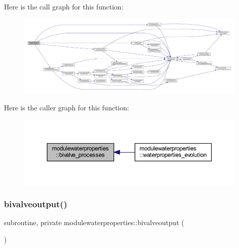 Here is the call graph for this function\+:\nopagebreak
\begin{figure}[H]
\begin{center}
\leavevmode
\includegraphics[width=350pt]{namespacemodulewaterproperties_aa43273d07b646deb6e4c72e757b19fbd_cgraph}
\end{center}
\end{figure}
Here is the caller graph for this function\+:\nopagebreak
\begin{figure}[H]
\begin{center}
\leavevmode
\includegraphics[width=350pt]{namespacemodulewaterproperties_aa43273d07b646deb6e4c72e757b19fbd_icgraph}
\end{center}
\end{figure}
\mbox{\label{namespacemodulewaterproperties_a8446703f7cbfef308ed1b6f7114594a2}} 
\subsubsection{\texorpdfstring{bivalveoutput()}{bivalveoutput()}}
{\footnotesize\ttfamily subroutine, private modulewaterproperties\+::bivalveoutput (\begin{DoxyParamCaption}{ }\end{DoxyParamCaption})\hspace{0.3cm}{\ttfamily [private]}}

